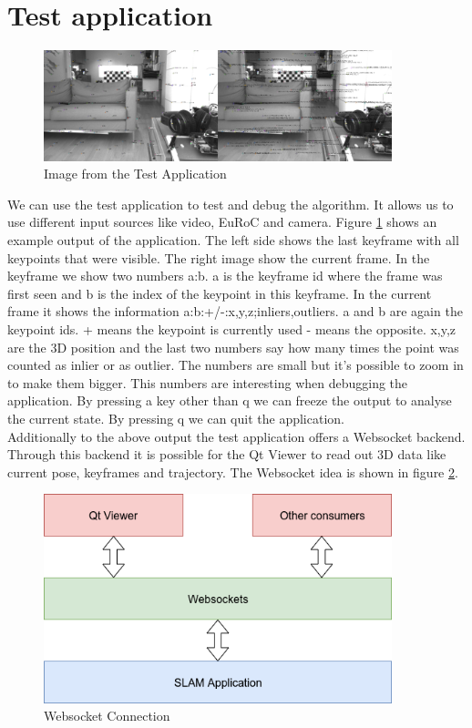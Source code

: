 \documentclass[11pt,a4paper,titlepage,oneside]{report}
\begin{document}
\section{Test application}

\begin{figure}[H]
  \centering
  \includegraphics[width=0.9\textwidth]{img/test_app.png}
  \caption{Image from the Test Application}\label{fig:test_app}
\end{figure}

We can use the test application to test and debug the algorithm. It allows us to use different input sources like video, EuRoC and camera. Figure \ref{fig:test_app} shows an example output of the application. The left side shows the last keyframe with all keypoints that were visible. The right image show the current frame. In the keyframe we show two numbers a:b. a is the keyframe id where the frame was first seen and b is the index of the keypoint in this keyframe. In the current frame it shows the information a:b:+/-:x,y,z;inliers,outliers. a and b are again the keypoint ids. + means the keypoint is currently used - means the opposite. x,y,z are the 3D position and the last two numbers say how many times the point was counted as inlier or as outlier. The numbers are small but it's possible to zoom in to make them bigger. This numbers are interesting when debugging the application. By pressing a key other than q we can freeze the output to analyse the current state. By pressing q we can quit the application.\\
Additionally to the above output the test application offers a Websocket \cite{websocket} backend. Through this backend it is possible for the Qt Viewer to read out 3D data like current pose, keyframes and trajectory. The Websocket idea is shown in figure \ref{fig:websocket}.

\begin{figure}[H]
  \centering
  \includegraphics[width=0.9\textwidth]{img/websocket.png}
  \caption{Websocket Connection}\label{fig:websocket}
\end{figure}
\end{document}

